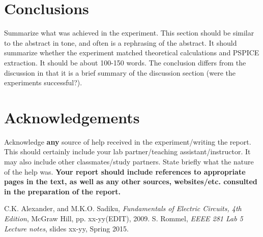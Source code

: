 \documentclass[11pt]{article}
\begin{document}
\section {Conclusions}
Summarize what was achieved in the experiment. This section should be similar to the abstract in tone, and often is a rephrasing of the abstract. It should summarize whether the experiment matched theoretical calculations and PSPICE extraction. It should be about 100-150 words.  The conclusion differs from the discussion in that it is a brief summary of the discussion section (were the experiments successful?).
\section{Acknowledgements}
Acknowledge \textbf{any} source of help received in the experiment/writing the report. This should certainly include your lab partner/teaching assistant/instructor. It may also include other classmates/study partners. State briefly what the nature of the help was.
\textbf{Your report should include references to appropriate pages in the text, as well as any other sources, websites/etc. consulted in the preparation of the report. }

\begin{thebibliography}{9}
	C.K. Alexander, and M.K.O. Sadiku,
	\emph{Fundamentals of Electric Circuits, 4th Edition},
	McGraw Hill, pp. xx-yy(EDIT), 2009.
	S. Rommel,
	\emph{EEEE 281 Lab 5 Lecture notes},
	slides xx-yy, Spring 2015.
\end{thebibliography}
\end{document}
